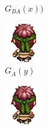 \documentclass[twocolumn,11pt]{ctexart}
\begin{document}
\begin{figure}[htb]
\begin{subfigure}[b]{0.23\linewidth}
        \caption{$G_{BA}(x))$}
      \end{subfigure}
      \begin{subfigure}[b]{0.23\linewidth}
        \includegraphics[width=\linewidth]{exp5_epoch140_idt_A.png}
        \caption{$G_A(y)$}
      \end{subfigure}
      \begin{subfigure}[b]{0.23\linewidth}
        \includegraphics[width=\linewidth]{exp5_epoch140_real_B.png}

\end{subfigure}
\end{figure}
\end{document}
